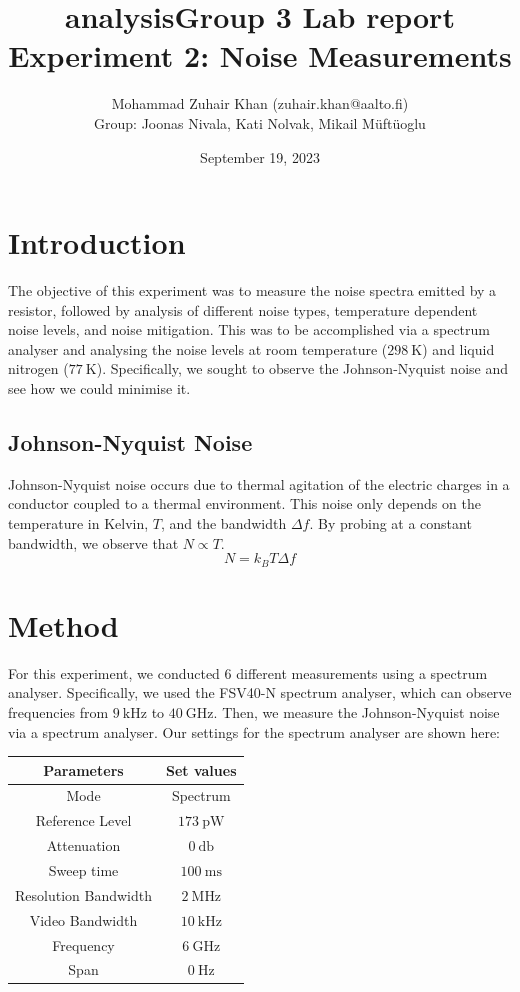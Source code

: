 \documentclass[english,12pt,a4paper]{article}
\title{analysis}
\title{Group 3 Lab report\\Experiment 2: Noise Measurements}
\author{Mohammad Zuhair Khan (zuhair.khan@aalto.fi)\\Group: Joonas Nivala, Kati Nolvak, Mikail Müftüoglu}
\date{September 19, 2023}
\begin{document}
\maketitle
\newpage
\tableofcontents
\newpage
\section{Introduction}
The objective of this experiment was to measure the noise spectra emitted by a resistor, followed by analysis of different noise types, temperature dependent noise levels, and noise mitigation\autocite{morstedtExperimentNoiseMeasurements2023}. This was to be accomplished via a spectrum analyser and analysing the noise levels at room temperature ($\qty{298}{\kelvin}$) and liquid nitrogen ($\qty{77}{\kelvin}$). Specifically, we sought to observe the Johnson-Nyquist noise\autocite{nyquistThermalAgitationElectric1928} and see how we could minimise it.
\subsection{Johnson-Nyquist Noise}
Johnson-Nyquist noise occurs due to thermal agitation of the electric charges in a conductor coupled to a thermal environment\autocite{morstedtExperimentNoiseMeasurements2023,nyquistThermalAgitationElectric1928}. This noise only depends on the temperature in Kelvin, $T$, and the bandwidth $\Delta f$. By probing at a constant bandwidth, we observe that $N \propto T$.
\begin{equation}
	N = k_BT\Delta f
\end{equation}
\newpage
\section{Method}
For this experiment, we conducted $6$ different measurements using a spectrum analyser. Specifically, we used the FSV40-N spectrum analyser, which can observe frequencies from $\qty{9}{\kilo\hertz}$ to $\qty{40}{\giga\hertz}$. Then, we measure the Johnson-Nyquist noise via a spectrum analyser. Our settings for the spectrum analyser are shown here: 

\begin{tabular}{|c|c|}
	\hline
	Parameters & Set values \\
	\hline
	Mode & Spectrum \\
	\hline
	Reference Level  & $\qty{173}{\pico\watt}$ \\
	\hline
	Attenuation &$\qty{0}{\decibel}$ \\
	\hline
	Sweep time & $\qty{100}{\milli\second}$\\
	\hline
	Resolution Bandwidth&  $\qty{2}{\mega\hertz}$ \\
	\hline
	Video Bandwidth &  $\qty{10}{\kilo\hertz}$ \\
	\hline
	Frequency & $\qty{6}{\giga\hertz}$ \\
	\hline
	Span &  $\qty{0}{\hertz}$\\
	\hline
\end{tabular}
\end{document}
